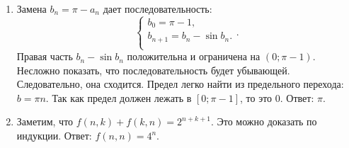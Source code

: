 \begin{enumerate}
\item Замена $b_n = \pi - a_n$ дает последовательность: 
$$
\begin{cases}
b_0 = \pi - 1,\\
b_{n+1} = b_n - \sin{b_n}.\\
\end{cases}. 
$$
Правая часть $b_n - \sin{b_n}$ положительна и ограничена на $(0; \pi - 1)$. Несложно показать, что последовательность будет убывающей. Следовательно, она сходится. Предел легко найти из предельного перехода: $b = \pi n$. Так как предел должен лежать в $[0; \pi - 1]$, то это 0. Ответ: $\pi$.

\item Заметим, что $f(n, k) + f(k, n) = 2^{n + k + 1}$. Это можно доказать по индукции. Ответ: $f(n, n) = 4^n$.
\end{enumerate}
